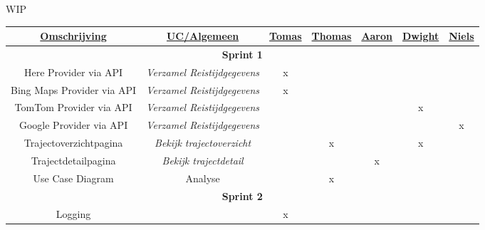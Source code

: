 WIP

\begin{table}[H]
\centering
\begin{tabular}{|c|c|c|c|c|c|c|}
\hline
{\ul \textbf{Omschrijving}} & {\ul \textbf{UC/Algemeen}}         & {\ul \textbf{Tomas}} & {\ul \textbf{Thomas}} & {\ul \textbf{Aaron}} & {\ul \textbf{Dwight}} & {\ul \textbf{Niels}} \\ \hline
																					 \multicolumn{7}{|c|}{\textbf{Sprint 1}}                                                          \\ \hline
Here Provider via API       & \textit{Verzamel Reistijdgegevens} & x                    &                       &                      &                       &                      \\ \hline
Bing Maps Provider via API  & \textit{Verzamel Reistijdgegevens} & x                    &                       &                      &                       &                      \\ \hline
TomTom Provider via API     & \textit{Verzamel Reistijdgegevens} &                      &                       &                      & x                     &                      \\ \hline
Google Provider via API     & \textit{Verzamel Reistijdgegevens} &                      &                       &                      &                       & x                    \\ \hline
Trajectoverzichtpagina      & \textit{Bekijk trajectoverzicht}   &                      & x                     &                      & x                     &                      \\ \hline
Trajectdetailpagina         & \textit{Bekijk trajectdetail}      &                      &                       & x                    &                       &                      \\ \hline
Use Case Diagram            & Analyse                            &                      & x                     &                      &                       &                      \\ \hline
																					 \multicolumn{7}{|c|}{\textbf{Sprint 2}}                                                          \\ \hline
Logging                     &                                    & x                    &                       &                      &                       &                      \\ \hline

\end{tabular}
\end{table}
